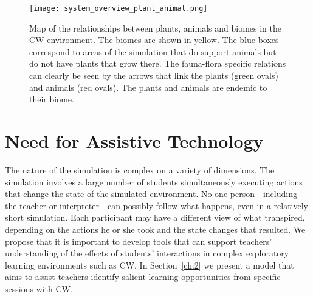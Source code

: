 \begin{figure}
\centering
\texttt{[image: system\_overview\_plant\_animal.png]}
\caption{Map of the relationships between plants, animals and biomes in the CW environment. The biomes are shown in yellow. The blue boxes correspond to areas of the simulation that do support animals but do not have plants that grow there. The fauna-flora specific relations can clearly be seen by the arrows that link the plants (green ovals) and animals (red ovals). The plants and animals are endemic to their biome.}
\label{fig:system_overview_plant_animal}
\end{figure}

\section{Need for Assistive Technology}\label{sec:need_for_assistive_tech}
The nature of the simulation is complex on a variety of dimensions. The simulation involves a large number of students simultaneously executing actions that change the state of the simulated environment.  No one person - including the teacher or interpreter - can possibly follow what happens, even in a relatively short simulation. Each participant may have a different view of what transpired, depending on the actions he or she took and the state changes that resulted. We propose that it is important to develop tools that can support teachers' understanding of the effects of students' interactions in complex exploratory learning environments such as CW. In Section~\ref{ch:2} we present a model that aims to assist teachers identify salient learning opportunities from specific sessions with CW.
